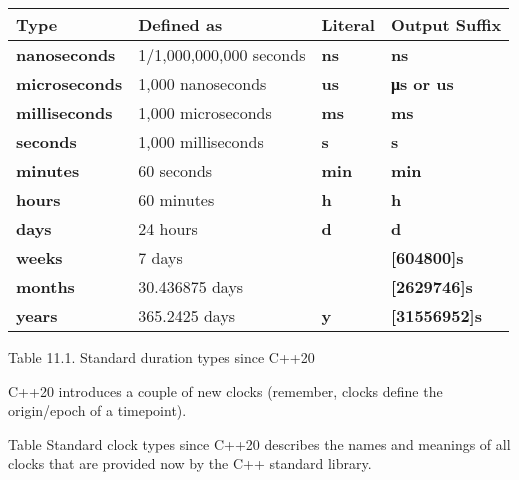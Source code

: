 \begin{longtable}[c]{|l|l|l|l|}
\hline
\textbf{Type}         & \textbf{Defined as}     & \textbf{Literal} & \textbf{Output Suffix}   \\ \hline
\endfirsthead
%
\endhead
%
\textbf{nanoseconds}  & 1/1,000,000,000 seconds & \textbf{ns}      & \textbf{ns}              \\ \hline
\textbf{microseconds} & 1,000 nanoseconds       & \textbf{us}      & \textbf{μs or us}        \\ \hline
\textbf{milliseconds} & 1,000 microseconds      & \textbf{ms}      & \textbf{ms}              \\ \hline
\textbf{seconds}      & 1,000 milliseconds      & \textbf{s}       & \textbf{s}               \\ \hline
\textbf{minutes}      & 60 seconds              & \textbf{min}     & \textbf{min}             \\ \hline
\textbf{hours}        & 60 minutes              & \textbf{h}       & \textbf{h}               \\ \hline
\textbf{days}         & 24 hours                & \textbf{d}       & \textbf{d}               \\ \hline
\textbf{weeks}        & 7 days                  & \textbf{}        & \textbf{{[}604800{]}s}   \\ \hline
\textbf{months}       & 30.436875 days          & \textbf{}        & \textbf{{[}2629746{]}s}  \\ \hline
\textbf{years}        & 365.2425 days           & \textbf{y}       & \textbf{{[}31556952{]}s} \\ \hline
\end{longtable}

\begin{center}
Table 11.1. Standard duration types since C++20
\end{center}


C++20 introduces a couple of new clocks (remember, clocks define the origin/epoch of a timepoint).

Table Standard clock types since C++20 describes the names and meanings of all clocks that are provided now by the C++ standard library.

